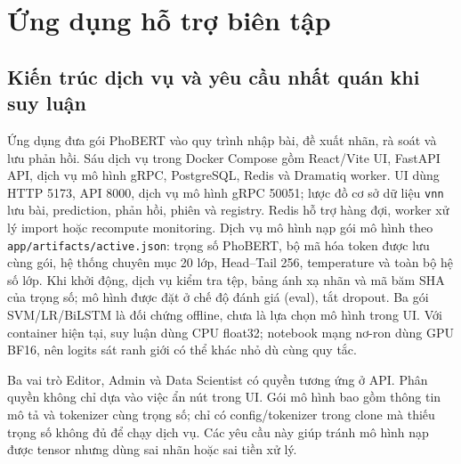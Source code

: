 \chapter{Ứng dụng hỗ trợ biên tập}\label{app:application}
\FloatBarrier
\section{Kiến trúc dịch vụ và yêu cầu nhất quán khi suy luận}
Ứng dụng đưa gói PhoBERT vào quy trình nhập bài, đề xuất nhãn, rà soát và lưu phản hồi. Sáu dịch vụ trong Docker Compose gồm React/Vite UI, FastAPI API, dịch vụ mô hình gRPC, PostgreSQL, Redis và Dramatiq worker. UI dùng HTTP 5173, API 8000, dịch vụ mô hình gRPC 50051; lược đồ cơ sở dữ liệu \texttt{vnn} lưu bài, prediction, phản hồi, phiên và registry. Redis hỗ trợ hàng đợi, worker xử lý import hoặc recompute monitoring.
\AppDiagram
Dịch vụ mô hình nạp gói mô hình theo \texttt{app/artifacts/active.json}: trọng số PhoBERT, bộ mã hóa token được lưu cùng gói, hệ thống chuyên mục 20 lớp, Head--Tail 256, temperature và toàn bộ hệ số lớp. Khi khởi động, dịch vụ kiểm tra tệp, bảng ánh xạ nhãn và mã băm SHA của trọng số; mô hình được đặt ở chế độ đánh giá (eval), tắt dropout. Ba gói SVM/LR/BiLSTM là đối chứng offline, chưa là lựa chọn mô hình trong UI. Với container hiện tại, suy luận dùng CPU float32; notebook mạng nơ-ron dùng GPU BF16, nên logits sát ranh giới có thể khác nhỏ dù cùng quy tắc.

Ba vai trò Editor, Admin và Data Scientist có quyền tương ứng ở API. Phân quyền không chỉ dựa vào việc ẩn nút trong UI. Gói mô hình bao gồm thông tin mô tả và tokenizer cùng trọng số; chỉ có config/tokenizer trong clone mà thiếu trọng số không đủ để chạy dịch vụ. Các yêu cầu này giúp tránh mô hình nạp được tensor nhưng dùng sai nhãn hoặc sai tiền xử lý.

\FloatBarrier
